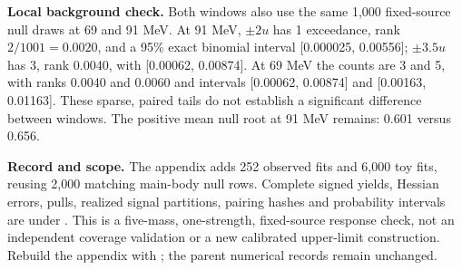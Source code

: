 \textbf{Local background check.} Both windows also use the same 1,000 fixed-source null draws at 69 and 91 MeV. At 91 MeV, $\pm2u$ has 1 exceedance, rank $2/1001=0.0020$, and a 95\% exact binomial interval [0.000025, 0.00556]; $\pm3.5u$ has 3, rank 0.0040, with [0.00062, 0.00874]. At 69 MeV the counts are 3 and 5, with ranks 0.0040 and 0.0060 and intervals [0.00062, 0.00874] and [0.00163, 0.01163]. These sparse, paired tails do not establish a significant difference between windows. The positive mean null root at 91 MeV remains: 0.601 versus 0.656.

\textbf{Record and scope.} The appendix adds 252 observed fits and 6,000 toy fits, reusing 2,000 matching main-body null rows. Complete signed yields, Hessian errors, pulls, realized signal partitions, pairing hashes and probability intervals are under . This is a five-mass, one-strength, fixed-source response check, not an independent coverage validation or a new calibrated upper-limit construction. Rebuild the appendix with ; the parent numerical records remain unchanged.
